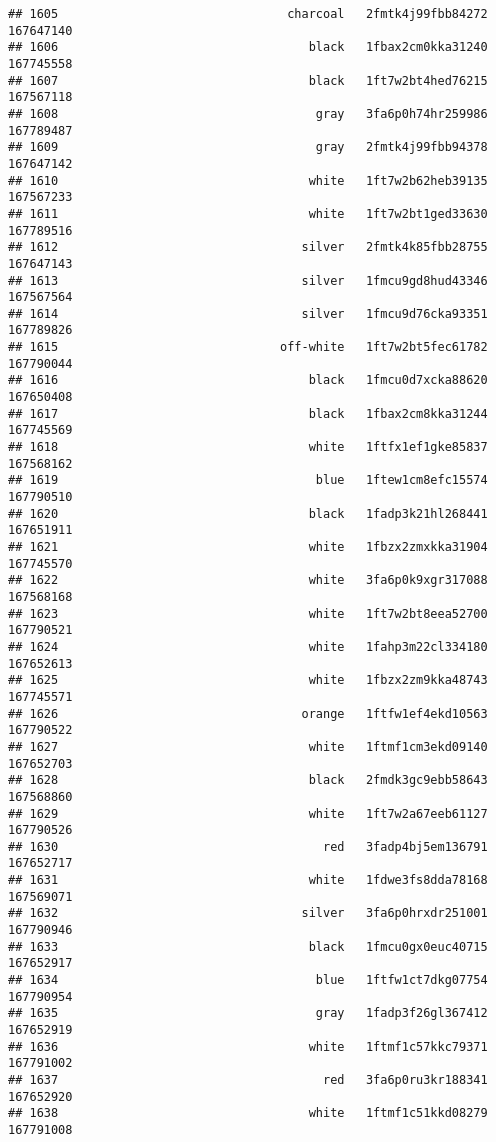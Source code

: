 \documentclass[
]{article}
\begin{document}
\begin{verbatim}
## 1605                                charcoal   2fmtk4j99fbb84272 167647140
## 1606                                   black   1fbax2cm0kka31240 167745558
## 1607                                   black   1ft7w2bt4hed76215 167567118
## 1608                                    gray   3fa6p0h74hr259986 167789487
## 1609                                    gray   2fmtk4j99fbb94378 167647142
## 1610                                   white   1ft7w2b62heb39135 167567233
## 1611                                   white   1ft7w2bt1ged33630 167789516
## 1612                                  silver   2fmtk4k85fbb28755 167647143
## 1613                                  silver   1fmcu9gd8hud43346 167567564
## 1614                                  silver   1fmcu9d76cka93351 167789826
## 1615                               off-white   1ft7w2bt5fec61782 167790044
## 1616                                   black   1fmcu0d7xcka88620 167650408
## 1617                                   black   1fbax2cm8kka31244 167745569
## 1618                                   white   1ftfx1ef1gke85837 167568162
## 1619                                    blue   1ftew1cm8efc15574 167790510
## 1620                                   black   1fadp3k21hl268441 167651911
## 1621                                   white   1fbzx2zmxkka31904 167745570
## 1622                                   white   3fa6p0k9xgr317088 167568168
## 1623                                   white   1ft7w2bt8eea52700 167790521
## 1624                                   white   1fahp3m22cl334180 167652613
## 1625                                   white   1fbzx2zm9kka48743 167745571
## 1626                                  orange   1ftfw1ef4ekd10563 167790522
## 1627                                   white   1ftmf1cm3ekd09140 167652703
## 1628                                   black   2fmdk3gc9ebb58643 167568860
## 1629                                   white   1ft7w2a67eeb61127 167790526
## 1630                                     red   3fadp4bj5em136791 167652717
## 1631                                   white   1fdwe3fs8dda78168 167569071
## 1632                                  silver   3fa6p0hrxdr251001 167790946
## 1633                                   black   1fmcu0gx0euc40715 167652917
## 1634                                    blue   1ftfw1ct7dkg07754 167790954
## 1635                                    gray   1fadp3f26gl367412 167652919
## 1636                                   white   1ftmf1c57kkc79371 167791002
## 1637                                     red   3fa6p0ru3kr188341 167652920
## 1638                                   white   1ftmf1c51kkd08279 167791008

\end{verbatim}
\end{document}
